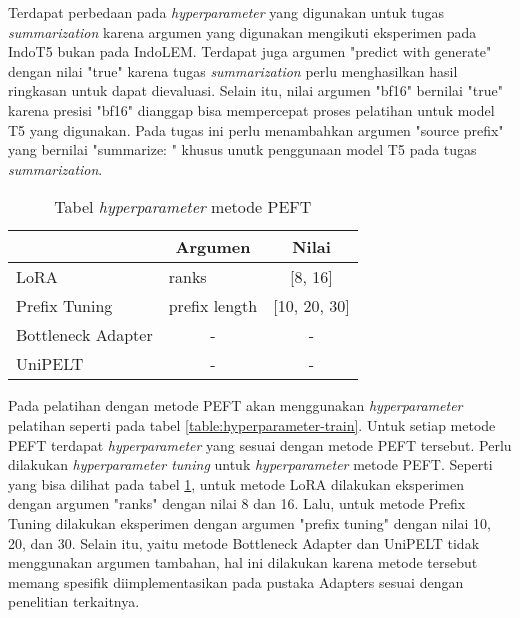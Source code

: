 Terdapat perbedaan pada \textit{hyperparameter} yang digunakan untuk tugas \textit{summarization} karena argumen yang digunakan mengikuti eksperimen pada IndoT5 bukan pada IndoLEM. Terdapat juga argumen "predict with generate" dengan nilai "true" karena tugas \textit{summarization} perlu menghasilkan hasil ringkasan untuk dapat dievaluasi. Selain itu, nilai argumen "bf16" bernilai "true" karena presisi "bf16" dianggap bisa mempercepat proses pelatihan untuk model T5 yang digunakan. Pada tugas ini perlu menambahkan argumen "source prefix" yang bernilai "summarize: " khusus unutk penggunaan model T5 pada tugas \textit{summarization}.

\begin{table}[h]
    \centering
    \caption{Tabel \textit{hyperparameter} metode PEFT}
    \label{table:hyperparameter-PEFT}
    \begin{tabular}{|l|l|c|}
        \hline \rowcolor{black!10}
        \multicolumn{1}{|c|}{\textbf{Metode}} & \multicolumn{1}{|c|}{\textbf{Argumen}} & \textbf{Nilai} \\ \hline
        LoRA & ranks & [8, 16] \\ \hline
        Prefix Tuning & prefix length & [10, 20, 30] \\ \hline
        Bottleneck Adapter & \multicolumn{1}{|c|}{-} & - \\ \hline
        UniPELT & \multicolumn{1}{|c|}{-}  & - \\ \hline
    \end{tabular}
\end{table}

Pada pelatihan dengan metode PEFT akan menggunakan \textit{hyperparameter} pelatihan seperti pada tabel \ref{table:hyperparameter-train}. Untuk setiap metode PEFT terdapat \textit{hyperparameter} yang sesuai dengan metode PEFT tersebut. Perlu dilakukan \textit{hyperparameter tuning} untuk \textit{hyperparameter} metode PEFT. Seperti yang bisa dilihat pada tabel \ref{table:hyperparameter-PEFT}, untuk metode LoRA dilakukan eksperimen dengan argumen "ranks" dengan nilai 8 dan 16. Lalu, untuk metode Prefix Tuning dilakukan eksperimen dengan argumen "prefix tuning" dengan nilai 10, 20, dan 30. Selain itu, yaitu metode Bottleneck Adapter dan UniPELT tidak menggunakan argumen tambahan, hal ini dilakukan karena metode tersebut memang spesifik diimplementasikan pada pustaka Adapters sesuai dengan penelitian terkaitnya.
